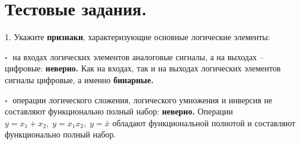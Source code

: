 \documentclass[spec, och, otchet, hidelinks]{SCWorks}
\begin{document}
\newpage




\newpage

\section*{Тестовые задания.}

1. Укажите \textbf{признаки}, характеризующие основные логические элементы:
\par $ \square \; $ на входах логических элементов аналоговые сигналы, а на выходах – цифровые: 
\textbf{неверно.} Как на входах, так и на выходах логических элементов сигналы цифровые, а именно
\textbf{бинарные.}

\par $ \square \; $ операции логического сложения, логического умножения и инверсия не составляют 
функционально полный набор: \textbf{неверно.} Операции $ y = x_1 + x_2, \; y = x_1 x_2, \; y = \bar x $
обладают функциональной полнотой и составляют функционально полный набор.
\end{document}
